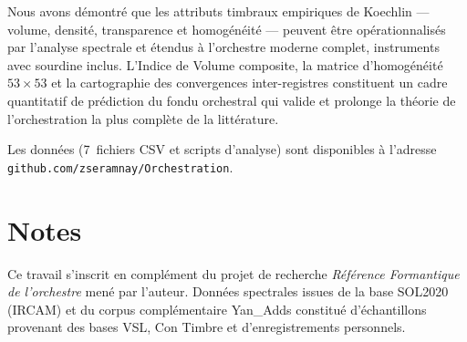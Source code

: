 \documentclass[journal]{IEEEtran}
\begin{document}
Nous avons démontré que les attributs timbraux empiriques de Koechlin --- volume, densité, transparence et homogénéité --- peuvent être opérationnalisés par l'analyse spectrale et étendus à l'orchestre moderne complet, instruments avec sourdine inclus. L'Indice de Volume composite, la matrice d'homogénéité $53 \times 53$ et la cartographie des convergences inter-registres constituent un cadre quantitatif de prédiction du fondu orchestral qui valide et prolonge la théorie de l'orchestration la plus complète de la littérature.

Les données (7~fichiers CSV et scripts d'analyse) sont disponibles à l'adresse \texttt{github.com/zseramnay/Orchestration}.

\section*{Notes}
Ce travail s'inscrit en complément du projet de recherche \textit{Référence Formantique de l'orchestre} mené par l'auteur. Données spectrales issues de la base SOL2020 (IRCAM) et du corpus complémentaire Yan\_Adds constitué d'échantillons provenant des bases VSL, Con Timbre et d'enregistrements personnels.
\end{document}
